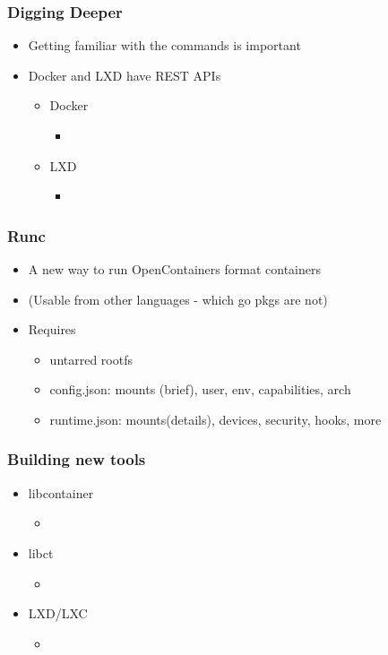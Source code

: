 \documentclass{beamer}
\begin{document}
\begin{frame}
\frametitle{Digging Deeper}
\begin{itemize}
\item Getting familiar with the commands is important
\item Docker and LXD have REST APIs
  \begin{itemize}
  \item Docker
    \begin{itemize}
    \item 
    \end{itemize}
  \item LXD
    \begin{itemize}
    \item 
    \end{itemize}
  \end{itemize}
\end{itemize}
\end{frame}

\begin{frame}
\frametitle{Runc}
\begin{itemize}
\item A new way to run OpenContainers format containers
\item (Usable from other languages - which go pkgs are not)
\item Requires
  \begin{itemize}
  \item untarred rootfs
  \item config.json: mounts (brief), user, env, capabilities, arch
  \item runtime.json: mounts(details), devices, security, hooks, more
  \end{itemize}
\end{itemize}
\end{frame}

\begin{frame}
\frametitle{Building new tools}
\begin{itemize}
\item libcontainer
  \begin{itemize}
  \item 
  \end{itemize}
\item libct
  \begin{itemize}
  \item 
  \end{itemize}
\item LXD/LXC
  \begin{itemize}
  \item 
  \end{itemize}
\end{itemize}
\end{frame}


\end{document}
